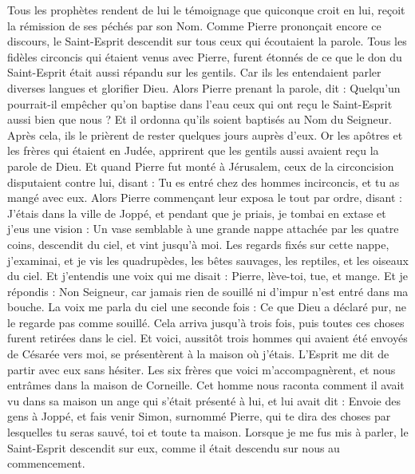 \begin{multicols}{2}
Tous les prophètes rendent de lui le témoignage que quiconque croit en lui, reçoit la rémission de ses péchés par son Nom.
Comme Pierre prononçait encore ce discours, le Saint-Esprit descendit sur tous ceux qui écoutaient la parole.
Tous les fidèles circoncis qui étaient venus avec Pierre, furent étonnés de ce que le don du Saint-Esprit était aussi répandu sur les gentils.
Car ils les entendaient parler diverses langues et glorifier Dieu.
Alors Pierre prenant la parole, dit : Quelqu’un pourrait-il empêcher qu’on baptise dans l’eau ceux qui ont reçu le Saint-Esprit aussi bien que nous ?
Et il ordonna qu'ils soient baptisés au Nom du Seigneur. Après cela, ils le prièrent de rester quelques jours auprès d’eux.
\VerseOne{}Or les apôtres et les frères qui étaient en Judée, apprirent que les gentils aussi avaient reçu la parole de Dieu.
Et quand Pierre fut monté à Jérusalem, ceux de la circoncision disputaient contre lui,
disant : Tu es entré chez des hommes incirconcis, et tu as mangé avec eux.
Alors Pierre commençant leur exposa le tout par ordre, disant :
J’étais dans la ville de Joppé, et pendant que je priais, je tombai en extase et j’eus une vision : Un vase semblable à une grande nappe attachée par les quatre coins, descendit du ciel, et vint jusqu'à moi.
Les regards fixés sur cette nappe, j’examinai, et je vis les quadrupèdes, les bêtes sauvages, les reptiles, et les oiseaux du ciel.
Et j’entendis une voix qui me disait : Pierre, lève-toi, tue, et mange.
Et je répondis : Non Seigneur, car jamais rien de souillé ni d’impur n’est entré dans ma bouche.
La voix me parla du ciel une seconde fois : Ce que Dieu a déclaré pur, ne le regarde pas comme souillé.
Cela arriva jusqu'à trois fois, puis toutes ces choses furent retirées dans le ciel.
Et voici, aussitôt trois hommes qui avaient été envoyés de Césarée vers moi, se présentèrent à la maison où j'étais.
L’Esprit me dit de partir avec eux sans hésiter. Les six frères que voici m’accompagnèrent, et nous entrâmes dans la maison de Corneille.
Cet homme nous raconta comment il avait vu dans sa maison un ange qui s'était présenté à lui, et lui avait dit : Envoie des gens à Joppé, et fais venir Simon, surnommé Pierre,
qui te dira des choses par lesquelles tu seras sauvé, toi et toute ta maison.
Lorsque je me fus mis à parler, le Saint-Esprit descendit sur eux, comme il était descendu sur nous au commencement.

\end{multicols}
